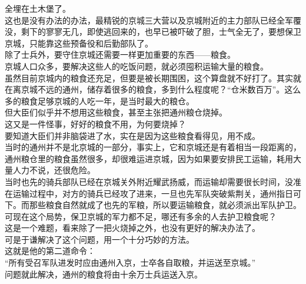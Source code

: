 \begin{multicols}{\theparacolNo}
全埋在土木堡了。\\

这也是没有办法的办法，最精锐的京城三大营以及京城附近的主力部队已经全军覆没，剩下的寥寥无几，即使逃回来的，也早已被吓破了胆，士气全无了，要想保卫京城，只能靠这些预备役和后勤部队了。\\

除了士兵外，要守住京城还需要一样更加重要的东西——粮食。\\

京城人口众多，要解决这些人的吃饭问题，就必须囤积运输大量的粮食。\\

虽然目前京城内的粮食还充足，但要是被长期围困，这个算盘就不好打了。其实就在离京城不远的通州，储存着很多的粮食，多到什么程度呢？“仓米数百万”。这么多的粮食足够京城的人吃一年，是当时最大的粮仓。\\

但大臣们似乎并不想用这些粮食，甚至主张把通州粮仓烧掉。\\

这又是一件怪事，好好的粮食不用，为何要烧掉？\\

要知道大臣们并非脑袋进了水，实在是因为这些粮食看得见，用不成。\\

当时的通州并不是北京城的一部分，事实上，它和京城还是有着相当一段距离的，通州粮仓里的粮食虽然很多，却很难运进京城，因为如果要安排民工运输，耗用大量人力不说，还很危险。\\

当时也先的骑兵部队已经在京城关外附近耀武扬威，而运输却需要很长时间，没准在运输过程中，对方的骑兵已经攻了进来，一旦也先军队突破紫荆关，通州指日可下。而那些粮食自然就成了也先的军粮，所以要运输粮食，就必须派出军队护卫。\\

可现在这个局势，保卫京城的军力都不足，哪还有多余的人去护卫粮食呢？\\

这是一个难题，看来除了一把火烧掉之外，也没有更好的解决办法了。\\

可是于谦解决了这个问题，用一个十分巧妙的方法。\\

这就是他的第二道命令：\\

“所有受召军队进发时应由通州入京，士卒各自取粮，并运送至京城。”\\

问题就此解决，通州的粮食将由十余万士兵运送入京。\\


\end{multicols}
